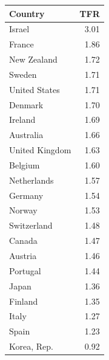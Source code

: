 \begin{center}
  \label{tab:countries}
  \vspace{0.4em}
  \small
  \begin{tabular}{lr}
    \toprule
    \textbf{Country} & \textbf{TFR} \\
    \midrule
    Israel & 3.01 \\
    France & 1.86 \\
    New Zealand & 1.72 \\
    Sweden & 1.71 \\
    United States & 1.71 \\
    Denmark & 1.70 \\
    Ireland & 1.69 \\
    Australia & 1.66 \\
    United Kingdom & 1.63 \\
    Belgium & 1.60 \\
    Netherlands & 1.57 \\
    Germany & 1.54 \\
    Norway & 1.53 \\
    Switzerland & 1.48 \\
    Canada & 1.47 \\
    Austria & 1.46 \\
    Portugal & 1.44 \\
    Japan & 1.36 \\
    Finland & 1.35 \\
    Italy & 1.27 \\
    Spain & 1.23 \\
    Korea, Rep. & 0.92 \\
    \bottomrule
  \end{tabular}
\end{center}
